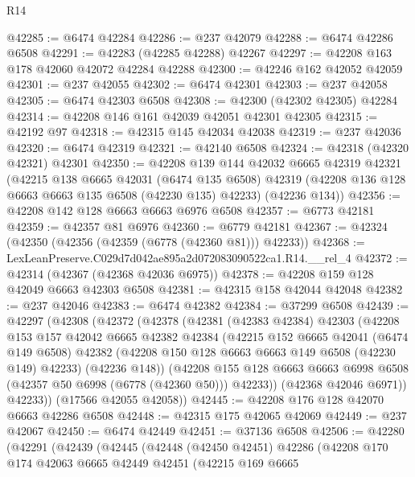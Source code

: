 \begin{lexlean}{R14}
\begin{coremodule}
@42285 := @6474 @42284
@42286 := @237 @42079
@42288 := @6474 @42286 @6508
@42291 := @42283 (@42285 @42288) @42267
@42297 := @42208 @163 @178 @42060 @42072 @42284 @42288
@42300 := @42246 @162 @42052 @42059
@42301 := @237 @42055
@42302 := @6474 @42301
@42303 := @237 @42058
@42305 := @6474 @42303 @6508
@42308 := @42300 (@42302 @42305) @42284
@42314 := @42208 @146 @161 @42039 @42051 @42301 @42305
@42315 := @42192 @97
@42318 := @42315 @145 @42034 @42038
@42319 := @237 @42036
@42320 := @6474 @42319
@42321 := @42140 @6508
@42324 := @42318 (@42320 @42321) @42301
@42350 := @42208
    @139
    @144
    @42032
    @6665
    @42319
    @42321
    (@42215
      @138
      @6665
      @42031
      (@6474 @135 @6508)
      @42319
      (@42208 @136 @128 @6663 @6663 @135 @6508 (@42230 @135) @42233)
      (@42236 @134))
@42356 := @42208 @142 @128 @6663 @6663 @6976 @6508
@42357 := @6773 @42181
@42359 := @42357 @81 @6976
@42360 := @6779 @42181
@42367 := @42324 (@42350 (@42356 (@42359 (@6778 (@42360 @81))) @42233))
@42368 := LexLeanPreserve.C029d7d042ae895a2d072083090522ca1.R14.__rel_4
@42372 := @42314 (@42367 (@42368 @42036 @6975))
@42378 := @42208 @159 @128 @42049 @6663 @42303 @6508
@42381 := @42315 @158 @42044 @42048
@42382 := @237 @42046
@42383 := @6474 @42382
@42384 := @37299 @6508
@42439 := @42297
    (@42308
      (@42372
        (@42378
          (@42381
            (@42383 @42384)
            @42303
            (@42208
              @153
              @157
              @42042
              @6665
              @42382
              @42384
              (@42215
                @152
                @6665
                @42041
                (@6474 @149 @6508)
                @42382
                (@42208 @150 @128 @6663 @6663 @149 @6508 (@42230 @149) @42233)
                (@42236 @148))
              (@42208
                @155
                @128
                @6663
                @6663
                @6998
                @6508
                (@42357 @50 @6998 (@6778 (@42360 @50)))
                @42233))
            (@42368 @42046 @6971))
          @42233))
      (@17566 @42055 @42058))
@42445 := @42208 @176 @128 @42070 @6663 @42286 @6508
@42448 := @42315 @175 @42065 @42069
@42449 := @237 @42067
@42450 := @6474 @42449
@42451 := @37136 @6508
@42506 := @42280
    (@42291
      (@42439
        (@42445
          (@42448
            (@42450 @42451)
            @42286
            (@42208
              @170
              @174
              @42063
              @6665
              @42449
              @42451
              (@42215
                @169
                @6665

\end{coremodule}
\end{lexlean}

